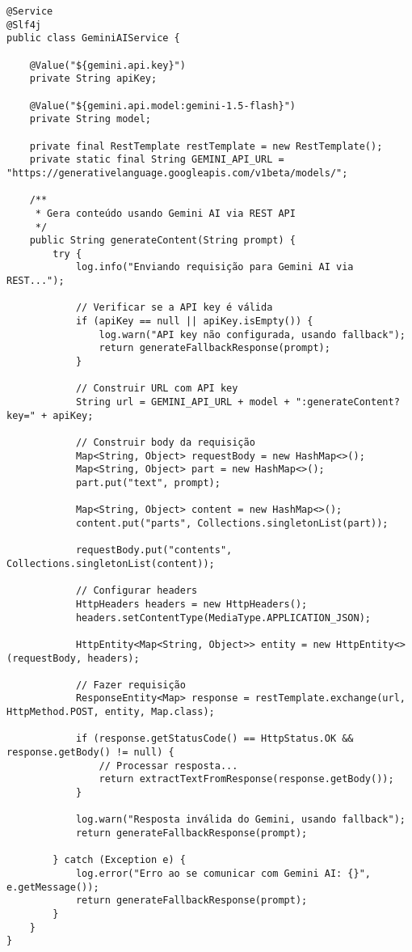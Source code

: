 \documentclass[12pt,a4paper]{article}
\begin{document}
\begin{lstlisting}[caption=GeminiAIService - Geração de Conteúdo]
@Service
@Slf4j
public class GeminiAIService {
    
    @Value("${gemini.api.key}")
    private String apiKey;
    
    @Value("${gemini.api.model:gemini-1.5-flash}")
    private String model;
    
    private final RestTemplate restTemplate = new RestTemplate();
    private static final String GEMINI_API_URL = "https://generativelanguage.googleapis.com/v1beta/models/";
    
    /**
     * Gera conteúdo usando Gemini AI via REST API
     */
    public String generateContent(String prompt) {
        try {
            log.info("Enviando requisição para Gemini AI via REST...");
            
            // Verificar se a API key é válida
            if (apiKey == null || apiKey.isEmpty()) {
                log.warn("API key não configurada, usando fallback");
                return generateFallbackResponse(prompt);
            }
            
            // Construir URL com API key
            String url = GEMINI_API_URL + model + ":generateContent?key=" + apiKey;
            
            // Construir body da requisição
            Map<String, Object> requestBody = new HashMap<>();
            Map<String, Object> part = new HashMap<>();
            part.put("text", prompt);
            
            Map<String, Object> content = new HashMap<>();
            content.put("parts", Collections.singletonList(part));
            
            requestBody.put("contents", Collections.singletonList(content));
            
            // Configurar headers
            HttpHeaders headers = new HttpHeaders();
            headers.setContentType(MediaType.APPLICATION_JSON);
            
            HttpEntity<Map<String, Object>> entity = new HttpEntity<>(requestBody, headers);
            
            // Fazer requisição
            ResponseEntity<Map> response = restTemplate.exchange(url, HttpMethod.POST, entity, Map.class);
            
            if (response.getStatusCode() == HttpStatus.OK && response.getBody() != null) {
                // Processar resposta...
                return extractTextFromResponse(response.getBody());
            }
            
            log.warn("Resposta inválida do Gemini, usando fallback");
            return generateFallbackResponse(prompt);
            
        } catch (Exception e) {
            log.error("Erro ao se comunicar com Gemini AI: {}", e.getMessage());
            return generateFallbackResponse(prompt);
        }
    }
}
\end{lstlisting}
\end{document}
